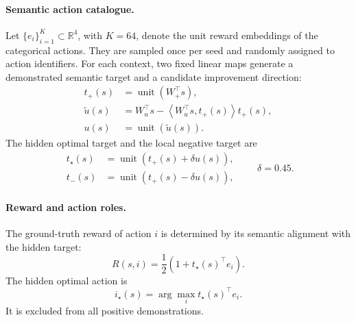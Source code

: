 \documentclass{article}
\theoremstyle{plain}
\theoremstyle{definition}
\theoremstyle{remark}
\begin{document}
\paragraph{Semantic action catalogue.}
Let
$\{e_i\}_{i=1}^{K}\subset\mathbb R^4$,
with $K=64$, denote the unit reward embeddings of the categorical
actions. They are sampled once per seed and randomly assigned to action
identifiers. For each context, two fixed linear maps generate a
demonstrated semantic target and a candidate improvement direction:
\begin{equation}
\begin{aligned}
    t_+(s)
    &=
    \operatorname{unit}
    \!\left(
    W_+^\top s
    \right), \\
    \widetilde u(s)
    &=
    W_u^\top s
    -
    \left\langle
        W_u^\top s,
        t_+(s)
    \right\rangle
    t_+(s), \\
    u(s)
    &=
    \operatorname{unit}
    \!\left(
        \widetilde u(s)
    \right).
\end{aligned}
\label{eq:du1_semantic_basis}
\end{equation}
The hidden optimal target and the local negative target are
\begin{equation}
\begin{aligned}
    t_\star(s)
    &=
    \operatorname{unit}
    \!\left(
        t_+(s)+\delta u(s)
    \right), \\
    t_-(s)
    &=
    \operatorname{unit}
    \!\left(
        t_+(s)-\delta u(s)
    \right),
\end{aligned}
\qquad
\delta=0.45.
\label{eq:du1_semantic_targets}
\end{equation}

\paragraph{Reward and action roles.}
The ground-truth reward of action $i$ is determined by its semantic
alignment with the hidden target:
\begin{equation}
    R(s,i)
    =
    \frac{1}{2}
    \left(
        1+
        t_\star(s)^\top e_i
    \right).
    \label{eq:du1_reward}
\end{equation}
The hidden optimal action is
\begin{equation}
    i_\star(s)
    =
    \arg\max_i
    t_\star(s)^\top e_i.
    \label{eq:du1_hidden_optimum}
\end{equation}
It is excluded from all positive demonstrations.
\end{document}
